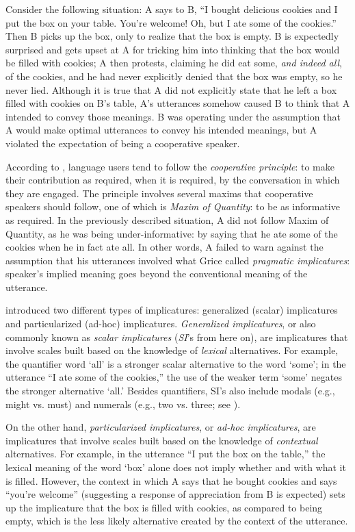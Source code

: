 \documentclass[10pt,letterpaper]{article}
\begin{document}
Consider the following situation: A says to B, ``I bought delicious cookies and I put the box on your table. You're welcome! Oh, but I ate some of the cookies.'' Then B picks up the box, only to realize that the box is empty. B is expectedly surprised and gets upset at A for tricking him into thinking that the box would be filled with cookies; A then protests, claiming he did eat some, \emph{and indeed all}, of the cookies, and he had never explicitly denied that the box was empty, so he never lied. Although it is true that A did not explicitly state that he left a box filled with cookies on B's table, A's utterances somehow caused B to think that A intended to convey those meanings. B was operating under the assumption that A would make optimal utterances to convey his intended meanings, but A violated the expectation of being a cooperative speaker.

According to , language users tend to follow the \emph{cooperative principle}: to make their contribution as required, when it is required, by the conversation in which they are engaged. The principle involves several maxims that cooperative speakers should follow, one of which is \emph{Maxim of Quantity}: to be as informative as required. In the previously described situation, A did not follow Maxim of Quantity, as he was being under-informative: by saying that he ate some of the cookies when he in fact ate all. In other words, A failed to warn against the assumption that his utterances involved what Grice called \emph{pragmatic implicatures}: speaker's implied meaning goes beyond the conventional meaning of the utterance.

 introduced two different types of implicatures: generalized (scalar) implicatures and particularized (ad-hoc) implicatures. \emph{Generalized implicatures}, or also commonly known as \emph{scalar implicatures} (\emph{SI}'s from here on), are implicatures that involve scales built based on the knowledge of \emph{lexical} alternatives. For example, the quantifier word `all' is a stronger scalar alternative to the word `some'; in the utterance ``I ate some of the cookies,'' the use of the weaker term `some' negates the stronger alternative `all.' Besides quantifiers, SI's also include modals (e.g., might vs. must) and numerals (e.g., two vs. three; see ).

On the other hand, \emph{particularized implicatures}, or \emph{ad-hoc implicatures}, are implicatures that involve scales built based on the knowledge of \emph{contextual} alternatives. For example, in the utterance ``I put the box on the table,'' the lexical meaning of the word `box' alone does not imply whether and with what it is filled. However, the context in which A says that he bought cookies and says ``you're welcome'' (suggesting a response of appreciation from B is expected) sets up the implicature that the box is filled with cookies, as compared to being empty, which is the less likely alternative created by the context of the utterance. 
\end{document}
